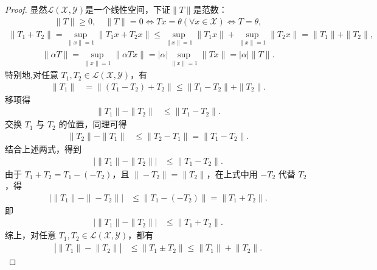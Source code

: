 \documentclass[../../main.tex]{subfiles}%
\begin{document}
\begin{proof}
显然$\mathscr{L}(\mathscr{X},\mathscr{Y})$是一个线性空间，下证$\|T\|$是范数：
\begin{align*}
\|T\|\geqslant 0,\quad \|T\|=0\iff Tx=\theta(\forall x\in\mathscr{X})\iff T=\theta,
\end{align*}
\begin{align*}
\|T_1+T_2\|=\sup_{\|x\|=1}\|T_1x+T_2x\|
\leqslant \sup_{\|x\|=1}\|T_1x\|+\sup_{\|x\|=1}\|T_2x\|
=\|T_1\|+\|T_2\|,
\end{align*}
\begin{align*}
\|\alpha T\|=\sup_{\|x\|=1}\|\alpha Tx\|=|\alpha|\sup_{\|x\|=1}\|Tx\|=|\alpha|\|T\|.
\end{align*}
特别地,对任意 \(T_1, T_2 \in \mathscr{L}(\mathscr{X}, \mathscr{Y})\)，有
\begin{align*}
\|T_1\| &= \|(T_1 - T_2) + T_2\| \leqslant \|T_1 - T_2\| + \|T_2\|.
\end{align*}
移项得
\begin{align*}
\|T_1\| - \|T_2\| &\leqslant \|T_1 - T_2\|.
\end{align*}
交换 \(T_1\) 与 \(T_2\) 的位置，同理可得
\begin{align*}
\|T_2\| - \|T_1\| &\leqslant \|T_2 - T_1\| = \|T_1 - T_2\|.
\end{align*}
结合上述两式，得到
\begin{align*}
\left| \|T_1\| - \|T_2\| \right| &\leqslant \|T_1 - T_2\|.
\end{align*}
由于 \(T_1 + T_2 = T_1 - (-T_2)\)，且 \(\|-T_2\| = \|T_2\|\)，在上式中用 \(-T_2\) 代替 \(T_2\)，得
\begin{align*}
\left| \|T_1\| - \|-T_2\| \right| &\leqslant \|T_1 - (-T_2)\| = \|T_1 + T_2\|.
\end{align*}
即
\begin{align*}
\left| \|T_1\| - \|T_2\| \right| &\leqslant \|T_1 + T_2\|.
\end{align*}
综上，对任意 \(T_1, T_2 \in \mathscr{L}(\mathscr{X}, \mathscr{Y})\)，都有
\begin{align*}
\left| \left\| T_1 \right\| -\left\| T_2 \right\| \right| &\leqslant \left\| T_1\pm T_2 \right\| \leqslant \left\| T_1 \right\| +\left\| T_2 \right\|.
\end{align*}


\end{proof}
\end{document}
